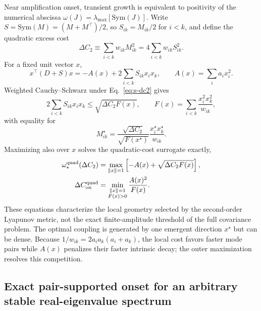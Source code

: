 \documentclass[
  aps,prl,preprint,notitlepage,superscriptaddress,nofootinbib,longbibliography,
  amsmath,amssymb
]{revtex4-2}
\begin{document}
Near amplification onset, transient growth is equivalent to positivity of the
numerical abscissa $\omega(J)=\lambda_{\max}[\mathrm{Sym}(J)]$.  Write
$S=\mathrm{Sym}(M)=(M+M^\top)/2$, so $S_{ik}=M_{ik}/2$ for $i<k$, and define the
quadratic excess cost
\begin{equation}
\Delta C_2\equiv\sum_{i<k}w_{ik}M_{ik}^2
=4\sum_{i<k}w_{ik}S_{ik}^2.
\label{eq:s-dc2}
\end{equation}
For a fixed unit vector $x$,
\begin{equation}
x^\top(D+S)x=-A(x)+2\sum_{i<k}S_{ik}x_ix_k,
\qquad A(x)=\sum_i a_i x_i^2.
\end{equation}
Weighted Cauchy--Schwarz under Eq.~\eqref{eq:s-dc2} gives
\begin{equation}
2\sum_{i<k}S_{ik}x_ix_k
\le\sqrt{\Delta C_2F(x)},\qquad
F(x)=\sum_{i<k}\frac{x_i^2x_k^2}{w_{ik}},
\label{eq:s-cs}
\end{equation}
with equality for
\begin{equation}
M^\star_{ik}=\frac{\sqrt{\Delta C_2}}{\sqrt{F(x^\star)}}
\frac{x_i^\star x_k^\star}{w_{ik}}.
\label{eq:s-genrankone}
\end{equation}
Maximizing also over $x$ solves the quadratic-cost surrogate exactly,
\begin{align}
\omega_\star^{\rm quad}(\Delta C_2)
&=\max_{\|x\|=1}\left[-A(x)+\sqrt{\Delta C_2F(x)}\right],
\label{eq:s-general-onset}\\
\Delta C_{\rm on}^{\rm quad}
&=\min_{\substack{\|x\|=1\\F(x)>0}}\frac{A(x)^2}{F(x)}.
\label{eq:s-general-threshold}
\end{align}
These equations characterize the local geometry selected by the second-order
Lyapunov metric, not the exact finite-amplitude threshold of the full covariance
problem.  The optimal coupling is generated by one emergent direction
$x^\star$ but can be dense.  Because
$1/w_{ik}=2a_i a_k(a_i+a_k)$, the local cost favors faster mode pairs while
$A(x)$ penalizes their faster intrinsic decay; the outer maximization resolves
this competition.

\subsection{Exact pair-supported onset for an arbitrary stable real-eigenvalue spectrum}
\label{sec:s-pair-exact}
\end{document}
